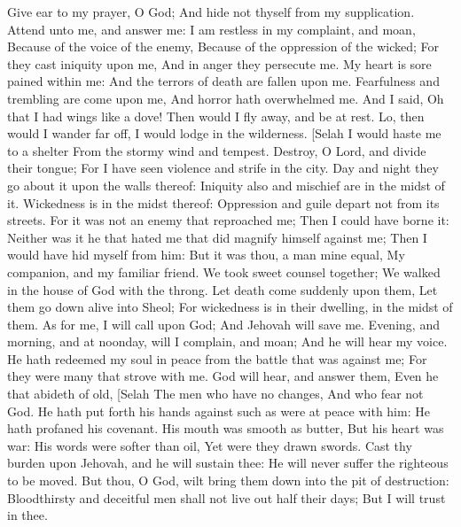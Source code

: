 Give ear to my prayer, O God; And hide not thyself from my supplication.  Attend unto me, and answer me: I am restless in my complaint, and moan,  Because of the voice of the enemy, Because of the oppression of the wicked; For they cast iniquity upon me, And in anger they persecute me.  My heart is sore pained within me: And the terrors of death are fallen upon me.  Fearfulness and trembling are come upon me, And horror hath overwhelmed me.  And I said, Oh that I had wings like a dove! Then would I fly away, and be at rest.  Lo, then would I wander far off, I would lodge in the wilderness. [Selah  I would haste me to a shelter From the stormy wind and tempest.  Destroy, O Lord, and divide their tongue; For I have seen violence and strife in the city.  Day and night they go about it upon the walls thereof: Iniquity also and mischief are in the midst of it.  Wickedness is in the midst thereof: Oppression and guile depart not from its streets.  For it was not an enemy that reproached me; Then I could have borne it: Neither was it he that hated me that did magnify himself against me; Then I would have hid myself from him:  But it was thou, a man mine equal, My companion, and my familiar friend.  We took sweet counsel together; We walked in the house of God with the throng.  Let death come suddenly upon them, Let them go down alive into Sheol; For wickedness is in their dwelling, in the midst of them.  As for me, I will call upon God; And Jehovah will save me.  Evening, and morning, and at noonday, will I complain, and moan; And he will hear my voice.  He hath redeemed my soul in peace from the battle that was against me; For they were many that strove with me.  God will hear, and answer them, Even he that abideth of old, [Selah The men who have no changes, And who fear not God.  He hath put forth his hands against such as were at peace with him: He hath profaned his covenant.  His mouth was smooth as butter, But his heart was war: His words were softer than oil, Yet were they drawn swords.  Cast thy burden upon Jehovah, and he will sustain thee: He will never suffer the righteous to be moved.  But thou, O God, wilt bring them down into the pit of destruction: Bloodthirsty and deceitful men shall not live out half their days; But I will trust in thee. 

